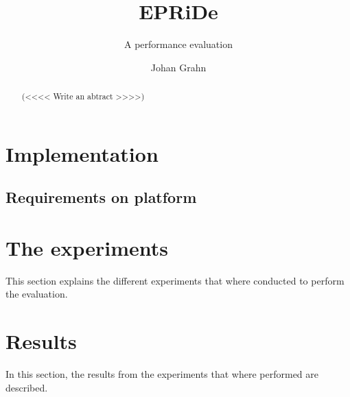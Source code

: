 \documentclass[MSc, ida]{histhesis}
\title{EPRiDe}
\subtitle{A performance evaluation}
\author{Johan Grahn}
\begin{document}
\maketitle
\begin{abstract}

(<<<< Write an abtract >>>>)

\end{abstract}
\tableofcontents
\thispagestyle{plain}
\listoffigures
\newpage

\newpage

\newpage

\newpage

\newpage

\newpage

\newpage

\section{Implementation} %
\label{sec:implementation}




\subsection{Requirements on platform} %
\label{sub:s}





\section{The experiments} %
\label{sec:the_experiments}

This section explains the different experiments that where conducted to perform the evaluation. 

\section{Results} %
\label{sec:results}

In this section, the results from the experiments that where performed are described. 
\end{document}
